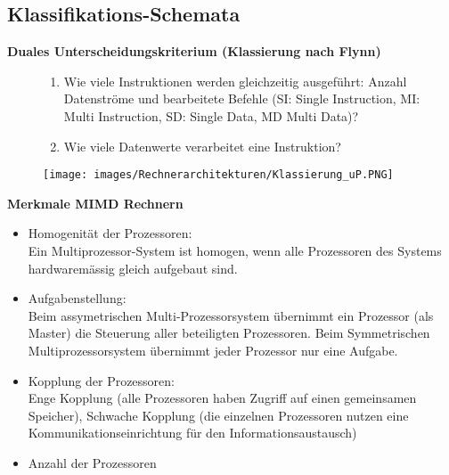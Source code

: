 \subsection{Klassifikations-Schemata}
\textbf{Duales Unterscheidungskriterium (Klassierung nach Flynn)}
\begin{figure}[htbp]
	
	\begin{minipage}{0.45\textwidth}		
		\begin{enumerate}[noitemsep,topsep=0pt]
			\item Wie viele Instruktionen werden gleichzeitig ausgeführt: Anzahl Datenströme und bearbeitete Befehle (SI: Single Instruction, MI: Multi Instruction, SD: Single Data, MD Multi Data)?
			
			\item Wie viele Datenwerte verarbeitet eine Instruktion?
		\end{enumerate}	
	\end{minipage}
	\hfill		
	\begin{minipage}{0.5\textwidth} 
		\texttt{[image: images/Rechnerarchitekturen/Klassierung\_uP.PNG]}
	\end{minipage}
	
\end{figure}

\clearpage
\textbf{Merkmale MIMD Rechnern}

\begin{itemize}[noitemsep,topsep=0pt]
	\item Homogenität der Prozessoren:\\
	Ein Multiprozessor-System ist homogen, wenn alle Prozessoren des Systems hardwaremässig gleich aufgebaut sind.
	
	\item Aufgabenstellung:\\
	Beim assymetrischen Multi-Prozessorsystem übernimmt ein Prozessor (als Master) die Steuerung aller beteiligten Prozessoren.
	Beim Symmetrischen Multiprozessorsystem übernimmt jeder Prozessor nur eine Aufgabe.
	
	\item Kopplung der Prozessoren:\\
	Enge Kopplung (alle Prozessoren haben Zugriff auf einen gemeinsamen Speicher), Schwache Kopplung (die einzelnen Prozessoren nutzen eine Kommunikationseinrichtung für den Informationsaustausch)
	
	\item Anzahl der Prozessoren
\end{itemize}
\vspace{-0.5cm}
